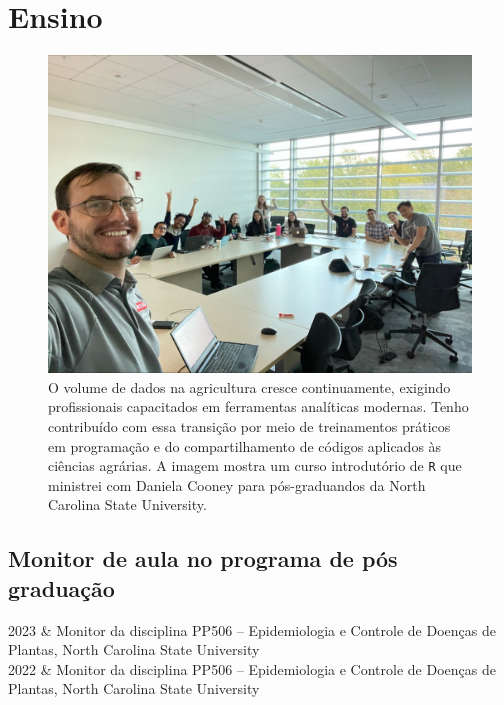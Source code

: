 \documentclass[12pt,a4paper,oneside]{book}
\newcommand{\NCState}{North Carolina State University}
\newcommand{\HeroFigPad}{\vspace{-1cm}}
\begin{document}
  \chapter{Ensino}
\label{cap_ensino}

\begin{figure}[h]
\HeroFigPad
\begin{center}
\includegraphics[width=\textwidth]{images/cursoR.jpg}
\end{center}
\caption{
  O volume de dados na agricultura cresce continuamente, exigindo profissionais capacitados em 
  ferramentas analíticas modernas. Tenho contribuído com essa transição por meio de treinamentos 
  práticos em programação e do compartilhamento de códigos aplicados às ciências agrárias. A imagem 
  mostra um curso introdutório de \texttt{R} que ministrei com Daniela Cooney para pós-graduandos da \NCState{}.}
\label{fig_cursoR}
\end{figure}


\section{Monitor de aula no programa de pós graduação}
\begin{subsummarybox}[frametitle=\faFilePdf{}\quad Resumo das atividades]
\begin{datelist}
2023 & Monitor da disciplina PP506 – Epidemiologia e Controle de Doenças de Plantas, North Carolina State University \\
2022 & Monitor da disciplina PP506 – Epidemiologia e Controle de Doenças de Plantas, North Carolina State University
\end{datelist}
\end{subsummarybox}
\end{document}
